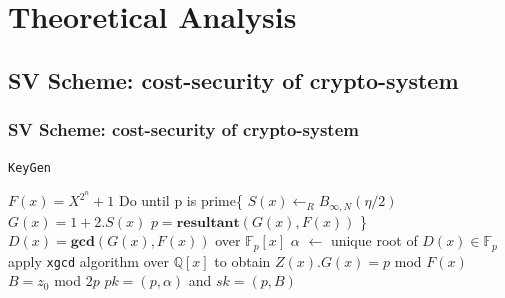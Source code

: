 \documentclass{beamer}
\begin{document}
\section{Theoretical Analysis}

\subsection{SV Scheme: cost-security of crypto-system}

\begin{frame} \frametitle{SV Scheme: cost-security of crypto-system}


    \begin{block}{\texttt{KeyGen}}

    $F(x)=X^{2^n}+1$
    \newline Do until p is prime\{ $S(x) \leftarrow_{R}B_{\infty , N}(\eta/2)$\;
    \newline \phantom{x}\hspace{3ex} $G(x)=1+2.S(x)$ 
    \newline \phantom{x}\hspace{3ex} $p= \mathrm{\textbf{resultant}}(G(x),F(x))$ \}
    \newline $D(x)=\mathrm{\textbf{gcd}}(G(x),F(x))$ over $\mathbb{F}_p[x]$
    \newline $\alpha$ $\leftarrow$ unique root of $D(x) \in \mathbb{F}_p $
    \newline apply \texttt{xgcd} algorithm over $\mathbb{Q}[x]$ to obtain $Z(x).G(x)=p$ mod $F(x)$
    \newline $B=z_0$ mod $2p$
    $pk = (p, \alpha)$ and $sk = (p , B)$
\end{block}
\end{frame}
\end{document}
